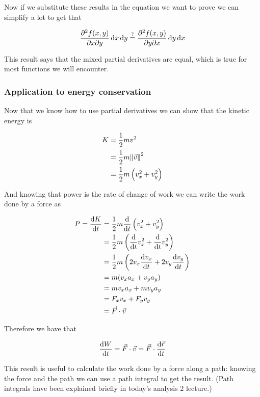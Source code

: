 \documentclass[10pt]{extarticle}
\begin{document}
Now if we substitute these results in the equation we want to prove we can simplify a lot to get that

$$
    \pdv{f(x, y)}{x}{y} \dd{x} \dd{y} \stackrel{?}{=} \pdv{f(x, y)}{y}{x} \dd{y} \dd{x}
$$

This result says that the mixed partial derivatives are equal, which is true for most functions we will encounter.

\subsubsection{Application to energy conservation}

Now that we know how to use partial derivatives we can show that the kinetic energy is

\begin{align*}
    K & = \frac{1}{2} m v^2                        \\
      & = \frac{1}{2} m \norm{\vec{v}}^2           \\
      & = \frac{1}{2} m \left(v_x^2 + v_y^2\right) \\
\end{align*}

And knowing that power is the rate of change of work we can write the work done by a force as

\begin{align*}
    P = \dv{K}{t} & = \frac{1}{2}m \dv{t} \left(v_x^2 + v_y^2\right)                  \\
                  & = \frac{1}{2}m \left(\dv{t} v_x^2 + \dv{t} v_y^2\right)           \\
                  & = \frac{1}{2}m \left(2 v_x \dv{v_x}{t} + 2 v_y \dv{v_y}{t}\right) \\
                  & = m (v_x a_x + v_y a_y)                                           \\
                  & = m v_x a_x + m v_y a_y                                           \\
                  & = F_x v_x + F_y v_y                                               \\
                  & = \vec F \cdot \vec v
\end{align*}

Therefore we have that

$$
    \dv{W}{t} = \vec F \cdot \vec v = \vec F \cdot \dv{\vec r}{t}
$$

This result is useful to calculate the work done by a force along a path:
knowing the force and the path we can use a path integral to get the result.
(Path integrals have been explained briefly in today's analysis 2 lecture.)
\end{document}
